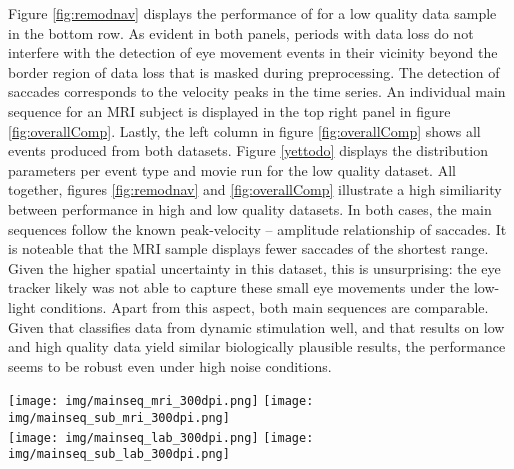 
Figure \ref{fig:remodnav} displays the performance of \remodnav for a low
quality data sample in the bottom row.  As evident in both panels, periods with
data loss do not interfere with the detection of eye movement events in their
vicinity beyond the border region of data loss that is masked during
preprocessing. The detection of saccades corresponds to the velocity peaks in
the time series. An individual main sequence for an MRI subject is displayed
in the top right panel in figure \ref{fig:overallComp}. Lastly, the left column in figure
\ref{fig:overallComp} shows all events produced from both datasets. Figure \ref{yettodo}
displays the distribution parameters per event type and movie run for the low
quality dataset. 
All together, figures \ref{fig:remodnav} and
\ref{fig:overallComp} illustrate a high similiarity between performance in high
and low quality datasets. In both cases, the main sequences follow the known
peak-velocity -- amplitude relationship of saccades. It is noteable that the
MRI sample displays fewer saccades of the shortest range. Given the higher
spatial uncertainty in this dataset, this is unsurprising: the eye tracker
likely was not able to capture these small eye movements under the low-light
conditions. Apart from this aspect, both main sequences are comparable. Given
that \remodnav classifies data from dynamic stimulation well, and that results
on low and high quality data yield similar biologically plausible results, the
performance seems to be robust even under high noise conditions.

\begin{figure*}[h!]
  \texttt{[image: img/mainseq\_mri\_300dpi.png]}
  \texttt{[image: img/mainseq\_sub\_mri\_300dpi.png]} \\
  \texttt{[image: img/mainseq\_lab\_300dpi.png]}
  \texttt{[image: img/mainseq\_sub\_lab\_300dpi.png]} \\

  \caption{Main sequence of eye movement events during one 15 minute sequence of
  the movie (segment 2) for MRI (top), and lab participants (bottom). Data
  across all participants is shown in the right, and data for a single
  exemplary participant on the left.}

  \label{fig:overallComp}
\end{figure*}


